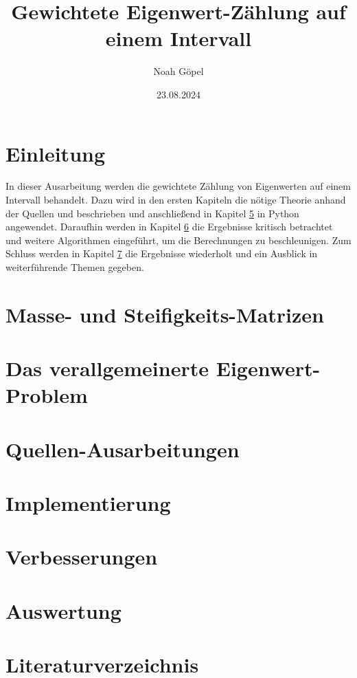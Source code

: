 \documentclass[ngerman,BCOR=4mm]{tudscrreprt}
\theoremstyle{plain} %
\theoremstyle{definition} %
\theoremstyle{remark}
\begin{document}

\date{23.08.2024}
\title{%
      Gewichtete Eigenwert-Zählung auf einem Intervall
}
\subject{bachelor}
\author{%
      Noah Göpel%
}
\maketitle

\clearpage
\tableofcontents
\clearpage
\listofsymbols
\clearpage

\chapter{Einleitung}
\label{sec: Einleitung}
      In dieser Ausarbeitung werden die gewichtete Zählung von Eigenwerten auf einem Intervall behandelt.
      Dazu wird in den ersten Kapiteln die nötige Theorie anhand der Quellen \cite{grundlageFutamura} und \cite{hauptteilTkachuk} beschrieben und anschließend in Kapitel \ref{sec: Programmieren} in Python angewendet.
      Daraufhin werden in Kapitel \ref{sec: Verbesserungen} die Ergebnisse kritisch betrachtet und weitere Algorithmen eingeführt, um die Berechnungen zu beschleunigen.
      Zum Schluss werden in Kapitel \ref{sec: Auswertung} die Ergebnisse wiederholt und ein Ausblick in weiterführende Themen gegeben.

\chapter{Masse- und Steifigkeits-Matrizen}
\label{sec: MS Matrizen}

      

\chapter{Das verallgemeinerte Eigenwert-Problem}
\label{sec: EW Problem}

\chapter{Quellen-Ausarbeitungen}

\chapter{Implementierung}
\label{sec: Programmieren}

\chapter{Verbesserungen}
\label{sec: Verbesserungen}

\chapter{Auswertung}
\label{sec: Auswertung}

\chapter{Literaturverzeichnis}
\printbibliography
\end{document}
